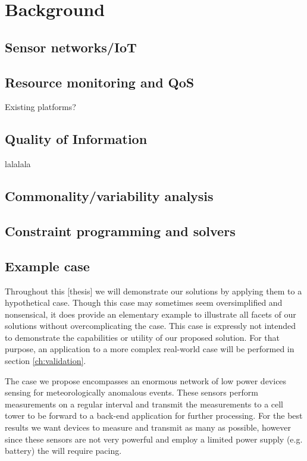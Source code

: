 \chapter{Background}
\section{Sensor networks/IoT}
\section{Resource monitoring and QoS} 
Existing platforms?
\section{Quality of Information}
\label{sec:back:qoi}
lalalala\cite{qoi_definition}
\section{Commonality/variability analysis}
\label{sec:back:cv_analysis}
\section{Constraint programming and solvers}
\label{sec:back:constraint}
\section{Example case}
\label{sec:back:example_case}
Throughout this [thesis] we will demonstrate our solutions by applying them to a hypothetical case. Though this case may sometimes seem oversimplified and nonsensical, it does provide an elementary example to illustrate all facets of our solutions without overcomplicating the case. This case is expressly not intended to demonstrate the capabilities or utility of our proposed solution. For that purpose, an application to a more complex real-world case will be performed in section \ref{ch:validation}. 

The case we propose encompasses an enormous network of low power devices sensing for meteorologically anomalous events. These sensors perform measurements on a regular interval and transmit the measurements to a cell tower to be forward to a back-end application for further processing. For the best results we want devices to measure and transmit as many as possible, however since these sensors are not very powerful and employ a limited power supply (e.g. battery) the will require pacing.

